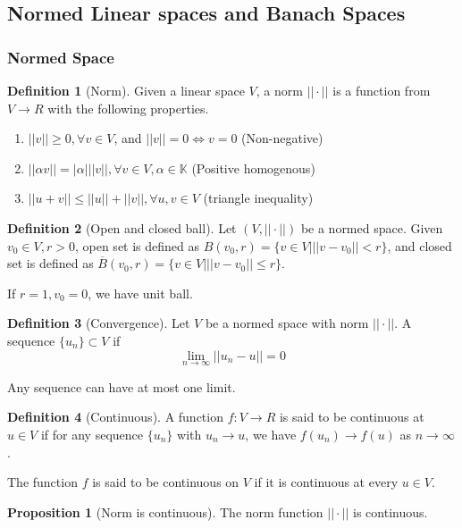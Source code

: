 \documentclass{article}
\theoremstyle{definition}
\newtheorem{definition}{Definition}[section]
\newtheorem{proposition}{Proposition}[section]
\begin{document}
\subsection{Normed Linear spaces and Banach Spaces}
\subsubsection{Normed Space}
\begin{definition}[Norm]
Given a linear space $V$, a norm $|| \cdot ||$ is a function from $V \to R$ with the following properties.
\begin{enumerate}
	\item $||v|| \geq 0, \forall v\in V$, and $||v||=0 \iff v=0$ (Non-negative)
	\item $||\alpha v||=|\alpha|||v||,\forall v\in V, \alpha \in \mathbb{K}$ (Positive homogenous)
	\item $||u+v|| \leq ||u||+||v||, \forall u, v \in V$ (triangle inequality)
\end{enumerate}
\end{definition}


\begin{definition}[Open and closed ball]
Let $(V, ||\cdot||)$ be a normed space. Given $v_0 \in V, r>0$, open set is defined as $B(v_0,r)=\{v \in V | ||v-v_0||<r \}$, and closed set is defined as $\overline{B}(v_0,r)=\{v \in V | ||v-v_0||\leq r\}$.
\end{definition}

If $r=1, v_0=0$, we have unit ball.

\begin{definition}[Convergence]
Let $V$ be a normed space with norm $||\cdot||$. A sequence $\{u_n\} \subset V$ if 
\begin{equation}
\lim_{n \to \infty} ||u_n-u||=0
\end{equation}
\end{definition}
Any sequence can have at most one limit.

\begin{definition}[Continuous]
A function $f:V\to R$ is said to be continuous at $u\in V$ if for any sequence $\{u_n\}$ with $u_n \to u$, we have $f(u_n) \to f(u)$ as $n \to \infty$. 
\end{definition}

The function $f$ is said to be continuous on $V$ if it is continuous at every $u\in V$.


\begin{proposition}[Norm is continuous]
The norm function $||\cdot||$ is continuous.
\end{proposition}
\end{document}
